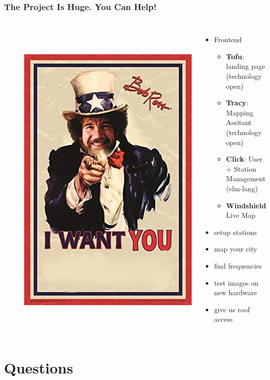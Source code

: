 \documentclass[aspectratio=169]{beamer}
\begin{document}
\begin{frame}
\frametitle{The Project Is Huge. You Can Help!}


\begin{figure}
\begin{columns}
\centering
  \includegraphics[height=0.75\textheight]{figs/bob_ross_wants_you.jpg}
\centering
\begin{itemize}
  \item Frontend
        \begin{itemize}
          \item \textbf{Tofu}: landing page (technology open)
          \item \textbf{Tracy}: Mapping Assitant (technology open)
          \item \textbf{Click}: User + Station Management (elm-lang)
          \item \textbf{Windshield} Live Map
        \end{itemize}
  \item setup stations
  \item map your city
  \item find frequencies
  \item test images on new hardware
  \item give us roof access
\end{itemize}
\end{columns}
\end{figure}


\end{frame}


\section{Questions}
\end{document}
